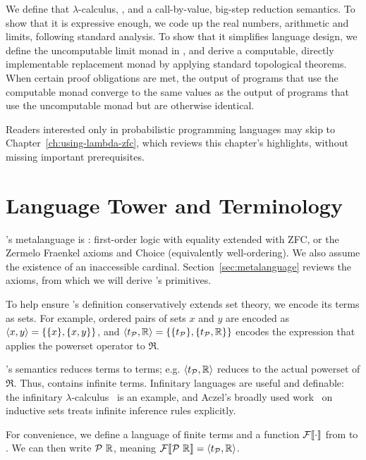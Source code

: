 We define that $\lambda$-calculus, \targetlang, and a call-by-value, big-step reduction semantics. To show that it is expressive enough, we code up the real numbers, arithmetic and limits, following standard analysis. To show that it simplifies language design, we define the uncomputable limit monad in \targetlang, and derive a computable, directly implementable replacement monad by applying standard topological theorems. When certain proof obligations are met, the output of programs that use the computable monad converge to the same values as the output of programs that use the uncomputable monad but are otherwise identical.

Readers interested only in probabilistic programming languages may skip to Chapter~\ref{ch:using-lambda-zfc}, which reviews this chapter's highlights, without missing important prerequisites.


\section{Language Tower and Terminology}

\targetlang's metalanguage is : first-order logic with equality extended with ZFC, or the Zermelo Fraenkel axioms and Choice (equivalently well-ordering). We also assume the existence of an inaccessible cardinal. Section~\ref{sec:metalanguage} reviews the axioms, from which we will derive \targetlang's primitives.

To help ensure \targetlang's definition conservatively extends set theory, we encode its terms as sets. For example, ordered pairs of sets $x$ and $y$ are encoded as $\langle{x,y}\rangle = \{{\{{x}\},\{{x,y}\}}\}$, and $\langle{t_{\mathcal{P}},\mathbb{R}}\rangle = \{{\{{t_{\mathcal{P}}}\},\{{t_{\mathcal{P}},\mathbb{R}}\}}\}$ encodes the expression that applies the powerset operator to $\Re$.

\targetlang's semantics reduces terms to terms; e.g. $\langle{t_{\mathcal{P}},\mathbb{R}}\rangle$ reduces to the actual powerset of $\Re$.
Thus, \targetlang contains infinite terms.
Infinitary languages are useful and definable: the infinitary $\lambda$-calculus~\cite{cit:kennaway-1996-inf-lc} is an example, and Aczel's broadly used work~\cite{cit:aczel-1977-inductive} on inductive sets treats infinite inference rules explicitly.

For convenience, we define a language \ftargetlang of finite terms and a function $\mathcal{F}\!\left\llbracket{\cdot}\right\rrbracket$ from \ftargetlang to \targetlang. We can then write $\mathcal{P}~\mathbb{R}$, meaning $\mathcal{F}\!\left\llbracket{\mathcal{P}~\mathbb{R}}\right\rrbracket = \langle{t_{\mathcal{P}},\mathbb{R}}\rangle$.

